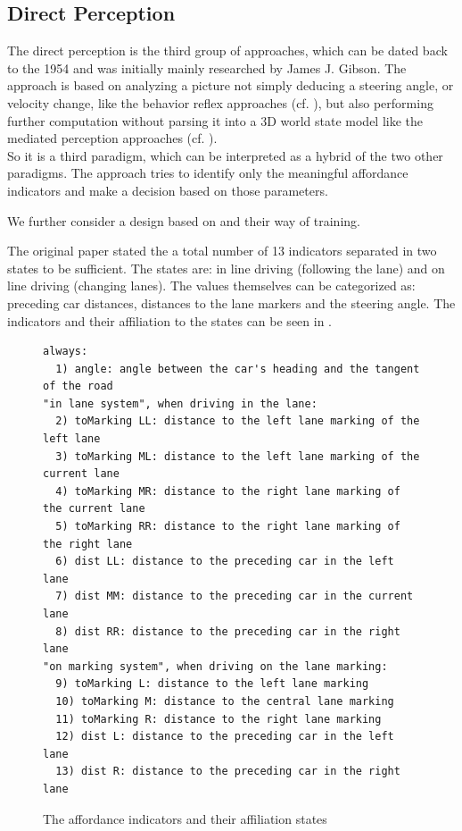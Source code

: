 \subsection{Direct Perception}\label{subsec: Direct Perception}


The direct perception is the third group of approaches, which can be dated back to the 1954 and was initially mainly researched by James J. Gibson. \cite{gibson1954theory} The approach is based on analyzing a picture not simply deducing a steering angle, or velocity change, like the behavior reflex approaches (cf. ), but also performing further computation without parsing it into a 3D world state model like the mediated perception approaches (cf. ). \cite{chen2015deepdriving}\\
So it is a third paradigm, which can be interpreted as a hybrid of the two other paradigms. The approach tries to identify only the meaningful affordance indicators and make a decision based on those parameters. 

We further consider a design based on \cite{chen2015deepdriving} and their way of training.

The original paper \cite{chen2015deepdriving} stated the a total number of 13 indicators separated in two states to be sufficient. The states are: in line driving (following the lane) and on line driving (changing lanes). The values themselves can be categorized as: preceding car distances, distances to the lane markers and the steering angle. The indicators and their affiliation to the states can be seen in .

\begin{figure}
\centering
\todoLine
\begin{lstlisting}
always:
  1) angle: angle between the car's heading and the tangent of the road
"in lane system", when driving in the lane:
  2) toMarking LL: distance to the left lane marking of the left lane
  3) toMarking ML: distance to the left lane marking of the current lane
  4) toMarking MR: distance to the right lane marking of the current lane
  5) toMarking RR: distance to the right lane marking of the right lane
  6) dist LL: distance to the preceding car in the left lane
  7) dist MM: distance to the preceding car in the current lane
  8) dist RR: distance to the preceding car in the right lane
"on marking system", when driving on the lane marking:
  9) toMarking L: distance to the left lane marking
  10) toMarking M: distance to the central lane marking
  11) toMarking R: distance to the right lane marking
  12) dist L: distance to the preceding car in the left lane
  13) dist R: distance to the preceding car in the right lane
\end{lstlisting}
\todoLine
\caption{The affordance indicators and their affiliation states}
\label{lst: affordance indicators}
\end{figure}

